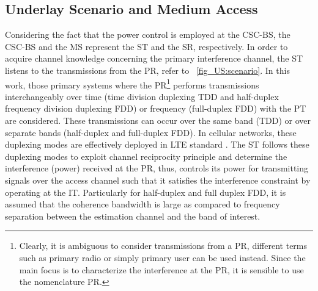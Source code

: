 \subsection{Underlay Scenario and Medium Access}

Considering the fact that the power control is employed at the CSC-BS, the CSC-BS and the MS represent the ST and the SR, respectively. In order to acquire channel knowledge concerning the primary interference channel, the ST listens to the transmissions from the PR, refer to \figurename~\ref{fig_US:scenario}. In this work, those primary systems where the PR\footnote{Clearly, it is ambiguous to consider transmissions from a PR, different terms such as primary radio or simply primary user can be used instead. Since the main focus is to characterize the interference at the PR, it is sensible to use the nomenclature PR.} performs transmissions interchangeably over time (time division duplexing TDD and half-duplex frequency division duplexing FDD) or frequency (full-duplex FDD) with the PT are considered. These transmissions can occur over the same band (TDD) or over separate bands (half-duplex and full-duplex FDD). 
In cellular networks, these duplexing modes are effectively deployed in LTE standard \cite{LTE09}. The ST follows these duplexing modes to exploit channel reciprocity principle and determine the interference (power) received at the PR, thus, controls its power for transmitting signals over the access channel such that it satisfies the interference constraint by operating at the IT. Particularly for half-duplex and full duplex FDD, it is assumed that the coherence bandwidth is large as compared to frequency separation between the estimation channel and the band of interest. 
